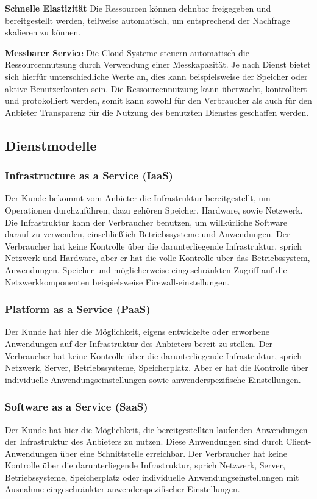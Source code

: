 \textbf{Schnelle Elastizität}
Die Ressourcen können dehnbar freigegeben und bereitgestellt werden, teilweise automatisch, um entsprechend der Nachfrage skalieren zu können\cite{nist_definition}.

\textbf{Messbarer Service}
Die Cloud-Systeme steuern automatisch die Ressourcennutzung durch Verwendung einer Messkapazität. Je nach Dienst bietet sich hierfür unterschiedliche Werte an, dies kann beispielsweise der Speicher oder aktive Benutzerkonten sein. Die Ressourcennutzung kann überwacht, kontrolliert und protokolliert werden, somit kann sowohl für den Verbraucher als auch für den Anbieter Transparenz für die Nutzung des benutzten Dienstes geschaffen werden\cite{nist_definition}.


\subsection{Dienstmodelle}
\subsubsection{Infrastructure as a Service (IaaS)} \label{IaaS}
Der Kunde bekommt vom Anbieter die Infrastruktur bereitgestellt, um Operationen durchzuführen, dazu gehören Speicher, Hardware, sowie Netzwerk. Die Infrastruktur kann der Verbraucher benutzen, um willkürliche Software darauf zu verwenden, einschließlich Betriebssysteme und Anwendungen. Der Verbraucher hat keine Kontrolle über die darunterliegende Infrastruktur, sprich Netzwerk und Hardware, aber er hat die volle Kontrolle über das Betriebssystem, Anwendungen, Speicher und möglicherweise eingeschränkten Zugriff auf die Netzwerkkomponenten beispielsweise Firewall-einstellungen\cite{nist_definition}.

\subsubsection{Platform as a Service (PaaS)} \label{PaaS} 
Der Kunde hat hier die Möglichkeit, eigens entwickelte oder erworbene Anwendungen auf der Infrastruktur des Anbieters bereit zu stellen. Der Verbraucher hat keine Kontrolle über die darunterliegende Infrastruktur, sprich Netzwerk, Server, Betriebssysteme, Speicherplatz. Aber er hat die Kontrolle über individuelle Anwendungseinstellungen sowie anwenderspezifische Einstellungen\cite{nist_definition}.

\subsubsection{Software as a Service (SaaS)} \label{SaaS}
Der Kunde hat hier die Möglichkeit, die bereitgestellten laufenden Anwendungen der Infrastruktur des Anbieters zu nutzen. Diese Anwendungen sind durch Client-Anwendungen über eine Schnittstelle erreichbar. Der Verbraucher hat keine Kontrolle über die darunterliegende Infrastruktur, sprich Netzwerk, Server, Betriebssysteme, Speicherplatz oder individuelle Anwendungseinstellungen mit Ausnahme eingeschränkter anwenderspezifischer Einstellungen\cite{nist_definition}.

